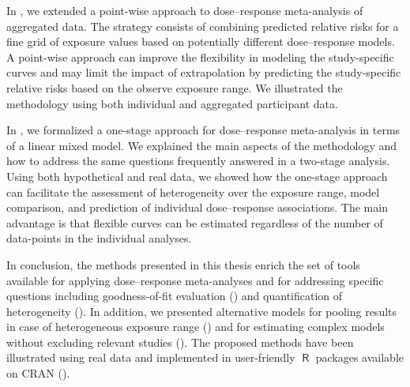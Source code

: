 \documentclass[11pt,a4paper,twoside,openany]{book}\usepackage{knitr}
\makeatletter
\def\cleardoublepage{\clearpage\if@twoside
\ifodd\c@page
\else\hbox{}\thispagestyle{empty}\newpage
\if@twocolumn\hbox{}\newpage\fi\fi\fi}
\DeclareMathOperator{\R}{\textsf{R}}
\makeatother
\begin{document}
{In , we extended a point-wise approach to dose--response meta-analysis of aggregated data. The strategy consists of combining predicted relative risks for a fine grid of exposure values based on potentially different dose--response models. A point-wise approach can improve the flexibility in modeling the study-specific curves and may limit the impact of extrapolation by predicting the study-specific relative risks based on the observe exposure range. We illustrated the methodology using both individual and aggregated participant data.

In , we formalized a one-stage approach for dose--response meta-analysis in terms of a linear mixed model. We explained the main aspects of the methodology and how to address the same questions frequently answered in a two-stage analysis. Using both hypothetical and real data, we showed how the one-stage approach can facilitate the assessment of heterogeneity over the exposure range, model comparison, and prediction of individual dose--response associations. The main advantage is that flexible curves can be estimated regardless of the number of data-points in the individual analyses.

In conclusion, the methods presented in this thesis enrich the set of tools available for applying dose--response meta-analyses and for addressing specific questions including goodness-of-fit evaluation () and quantification of heterogeneity (). In addition, we presented alternative models for pooling results in case of heterogeneous exposure range () and for estimating complex models without excluding relevant studies (). The proposed methods have been illustrated using real data and implemented in user-friendly $\R$ packages available on CRAN ().


\normalsize
\cleardoublepage

%


}
\end{document}
